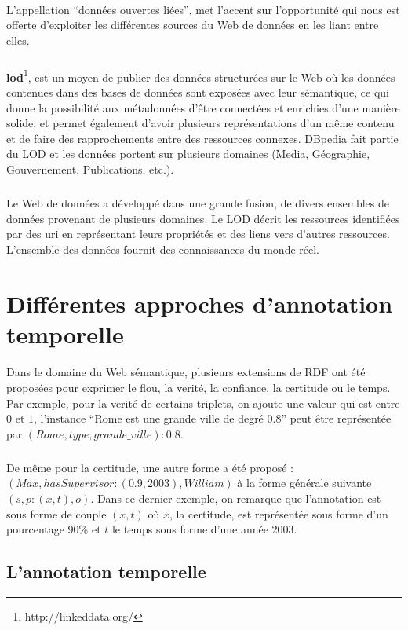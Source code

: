 \paragraph{}
L'appellation ``données ouvertes liées'', met l'accent sur l'opportunité qui nous est offerte d'exploiter les différentes sources du Web de données en les liant entre elles. 
\subparagraph{}
{\bf\gls{lod}}\footnote{http://linkeddata.org/}, est un moyen de publier des données structurées sur le Web où les données contenues dans des bases de données sont exposées avec leur sémantique, ce qui donne la possibilité aux métadonnées d'être connectées et enrichies d'une manière solide, et permet également d'avoir plusieurs représentations d'un même contenu et de faire des rapprochements entre des ressources connexes. DBpedia fait partie du LOD et les données portent sur plusieurs domaines (Media, Géographie, Gouvernement, Publications, etc.).
\subparagraph{}
Le Web de données a développé dans une grande fusion, de divers ensembles de données provenant de plusieurs domaines. Le LOD décrit les ressources identifiées par des \gls{uri} en représentant leurs propriétés et des liens vers d’autres ressources. L'ensemble des données fournit des connaissances du monde réel.
\newpage
\section{Différentes approches d'annotation temporelle}			
\paragraph{}
Dans le domaine du Web sémantique, plusieurs extensions de RDF ont été proposées pour exprimer le flou, la verité, la confiance, la certitude ou le temps.
Par exemple, pour la verité de certains triplets, on ajoute une valeur qui est entre $0$ et $1$, l’instance “Rome est une grande ville de degré 0.8” peut être représentée par $(Rome, type,grande{\_}ville) : 0.8$.
\subparagraph{}
De même pour la certitude, une autre forme a été proposé :
\newline
$(Max,hasSupervisor : (0.9,2003),William)$ à la forme générale suivante $(s, p : (x,t),o)$.
\newline
Dans ce dernier exemple, on remarque que l'annotation est sous forme de couple $(x, t)$ où $x$, la certitude, est représentée sous forme d'un pourcentage 90\% et $t$ le temps sous forme d'une année $2003$.
\subsection{L'annotation temporelle}
